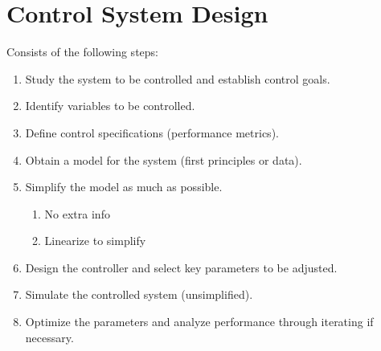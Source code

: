 \documentclass[11pt]{article}
\begin{document}
\section{Control System Design}
\label{sec:orge198d2f}
Consists of the following steps:
\begin{enumerate}
\item Study the system to be controlled and establish control goals.
\item Identify variables to be controlled.
\item Define control specifications (performance metrics).
\item Obtain a model for the system (first principles or data).
\item Simplify the model as much as possible.
\begin{enumerate}
\item No extra info
\item Linearize to simplify
\end{enumerate}
\item Design the controller and select key parameters to be adjusted.
\item Simulate the controlled system (unsimplified).
\item Optimize the parameters and analyze performance through iterating
if necessary.
\end{enumerate}
\end{document}

